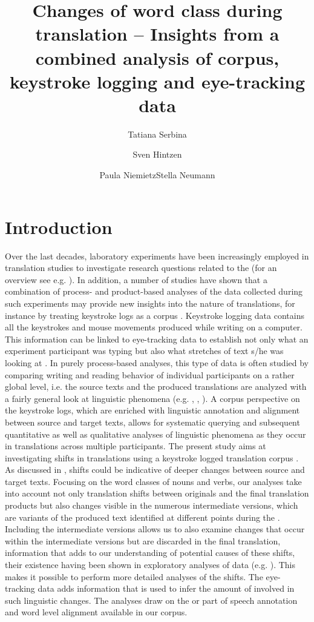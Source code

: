 \documentclass[output=paper]{LSP/langsci}
\title{Changes of word class during translation -- Insights from a combined analysis of corpus, keystroke logging and eye-tracking data}
\author{Tatiana Serbina\and Sven Hintzen\and Paula Niemietz\lastand Stella Neumann\affiliation{RWTH Aachen University}}
\begin{document}
\maketitle
\section{Introduction}\label{serbinaetal:sec:1}
Over the last decades, laboratory experiments have been increasingly employed in translation studies to investigate research questions related to the  (for an overview see e.g. \citealt{Gopferich2008}). In addition, a number of studies have shown that a combination of process- and product-based analyses of the data collected during such experiments may provide new insights into the nature of translations, for instance by treating keystroke logs as a corpus \citep{Alves2004, Alves:2009js, Alves2011On, Serbina2015Development, Serbina2015Part}. Keystroke logging data contains all the keystrokes and mouse movements produced while writing on a computer. This information can be linked to eye-tracking data to establish not only what an experiment participant was typing but also what stretches of text s/he was looking at \citep{Carl2009}. In purely process-based analyses, this type of data is often studied by comparing writing and reading behavior of individual participants on a rather global level, i.e. the source texts and the produced translations are analyzed with a fairly general look at linguistic phenomena (e.g. \citealt{Dragsted2008}, \citealt{Pavlovic2009}, \citealt{Jensen2011a}). A corpus perspective on the keystroke logs, which are enriched with linguistic annotation and alignment between source and target texts, allows for systematic querying and subsequent quantitative as well as qualitative analyses of linguistic phenomena as they occur in translations across multiple participants. The present study aims at investigating  shifts in translations using a keystroke logged translation corpus \citep{Serbina2015Development}. As discussed in ,  shifts could be indicative of deeper changes between source and target texts. Focusing on the word classes of nouns and verbs, our analyses take into account not only translation shifts between originals and the final translation products but also changes visible in the numerous intermediate versions, which are variants of the produced text identified at different points during the . Including the intermediate versions allows us to also examine changes that occur within the intermediate versions but are discarded in the final translation, information that adds to our understanding of potential causes of these shifts, their existence having been shown in exploratory analyses of  data (e.g. \citealt{Alves2010}). This makes it possible to perform more detailed analyses of the  shifts. The eye-tracking data adds information that is used to infer the amount of  involved in such linguistic changes. The analyses draw on the  or part of speech annotation and word level alignment available in our corpus. 
\end{document}
